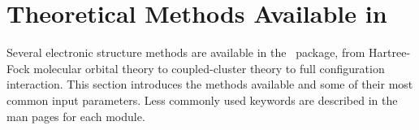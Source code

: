 \section{Theoretical Methods Available in \PSIthree}

Several electronic structure methods are available in the \PSIthree\
package, from Hartree-Fock molecular orbital theory to coupled-cluster
theory to full configuration interaction.  This section introduces
the methods available and some of their most common input parameters.
Less commonly used keywords are described in the man pages for each
module.
 
